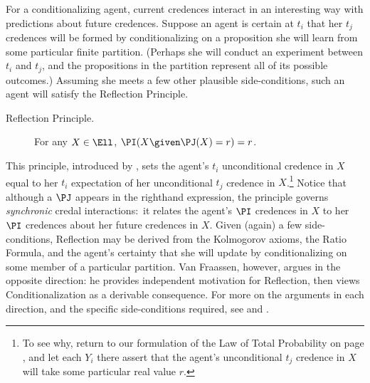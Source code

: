 For a conditionalizing agent, current credences interact in an interesting way with predictions about future credences. Suppose an agent is certain at $t_i$ that her $t_j$ credences will be formed by conditionalizing on a proposition she will learn from some particular finite partition. (Perhaps she will conduct an experiment between $t_i$ and $t_j$, and the propositions in the partition represent all of its possible outcomes.) Assuming she meets a few other plausible side-conditions, such an agent will satisfy the Reflection Principle.
\begin{description}
\item[Reflection Principle.\,]{For any $X \in \Ell$, $\PI(X \given \PJ(X)=r)=r$.} 
\end{description}
This principle, introduced by \citet{vanFraassenWill}, sets the agent's $t_i$ unconditional credence in $X$ equal to her $t_i$ expectation of her unconditional $t_j$ credence in $X$.\footnote
{To see why, return to our formulation of the Law of Total Probability on page \pageref{p:LTP}, and let each $Y_i$ there assert that the agent's unconditional $t_j$ credence in $X$ will take some particular real value $r$.}
 Notice that although a $\PJ$ appears in the righthand expression, the principle governs \emph{synchronic} credal interactions:\ it relates the agent's $\PI$ credences in $X$ to her $\PI$ credences about her future credences in $X$. Given (again) a few side-conditions, Reflection may be derived from the Kolmogorov axioms, the Ratio Formula, and the agent's certainty that she will update by conditionalizing on some member of a particular partition. Van Fraassen, however, argues in the opposite direction: he provides independent motivation for Reflection, then views Conditionalization as a derivable consequence. For more on the arguments in each direction, and the specific side-conditions required, see \citet{WeisbergConditionalization} and \citet{BriggsDistorted}.

